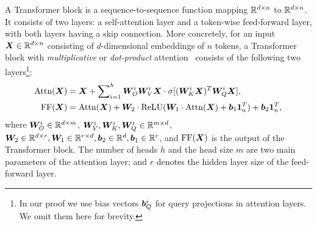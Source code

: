 


A Transformer block is a sequence-to-sequence function mapping $\mathbb{R}^{d \times n}$ to $\mathbb{R}^{d \times n}$. It consists of two layers: a self-attention layer and a token-wise feed-forward layer, with both layers having a skip connection. More concretely, for an input ${\bm{X}} \in \mathbb{R}^{d \times n}$ consisting of $d$-dimensional embeddings of $n$ tokens, a Transformer block with {\em multiplicative} or {\em dot-product} attention~\citep{luong2015multiplicativ} consists of the following two layers\footnote{In our proof we use bias vectors ${\bm{b}}_Q^i$ for query projections in attention layers. We omit them here for brevity.}:
\begin{align}
    \label{eq:attn}
    {\rm Attn}({\bm{X}}) &= {\bm{X}} + \sum\nolimits_{i=1}^h {\bm{W}}_O^i {\bm{W}}_V^i {\bm{X}} \cdot \sigma [({\bm{W}}_K^i {\bm{X}})^T {\bm{W}}_Q^i {\bm{X}}],\\
    \label{eq:ff}
    {\rm FF}({\bm{X}}) &= {\rm Attn}({\bm{X}}) + {\bm{W}}_2 \cdot {\rm ReLU} ({\bm{W}}_1 \cdot {\rm Attn}({\bm{X}}) + {\bm{b}}_1 {\bm{1}}_n^T) + {\bm{b}}_2 {\bm{1}}_n^T,
\end{align}
where ${\bm{W}}_O^i \in \mathbb{R}^{d \times m}$, ${\bm{W}}_V^i, {\bm{W}}_K^i, {\bm{W}}_Q^i \in \mathbb{R}^{m \times d}$, ${\bm{W}}_2 \in \mathbb{R}^{d \times r}, {\bm{W}}_1 \in \mathbb{R}^{r \times d}, {\bm{b}}_2 \in \mathbb{R}^{d}, {\bm{b}}_1 \in \mathbb{R}^{r}$, and ${\rm FF}({\bm{X}})$ is the output of the Transformer block. The number of heads $h$ and the head size $m$ are two main parameters of the attention layer; and $r$ denotes the hidden layer size of the feed-forward layer.

